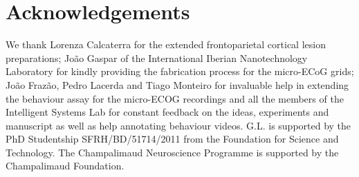 \section{Acknowledgements}

We thank Lorenza Calcaterra for the extended frontoparietal cortical lesion preparations; João Gaspar of the International Iberian Nanotechnology Laboratory for kindly providing the fabrication process for the micro-ECoG grids; João Frazão, Pedro Lacerda and Tiago Monteiro for invaluable help in extending the behaviour assay for the micro-ECOG recordings and all the members of the Intelligent Systems Lab for constant feedback on the ideas, experiments and manuscript as well as help annotating behaviour videos. G.L. is supported by the PhD Studentship SFRH/BD/51714/2011 from the Foundation for Science and Technology. The Champalimaud Neuroscience Programme is supported by the Champalimaud Foundation.